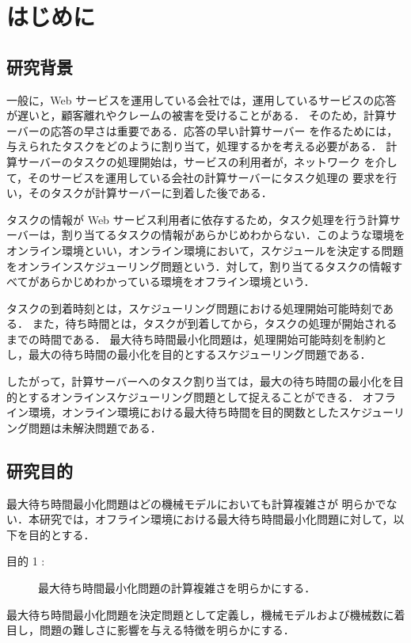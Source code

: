 \documentclass[12pt]{optlab-bachelor}
\begin{document}
\frontmatter

\chapter{はじめに}\label{c_1}
\section{研究背景}
一般に，Web サービスを運用している会社では，運用しているサービスの応答が遅いと，顧客離れやクレームの被害を受けることがある．
そのため，計算サーバーの応答の早さは重要である．応答の早い計算サーバー
を作るためには，与えられたタスクをどのように割り当て，処理するかを考える必要がある．
計算サーバーのタスクの処理開始は，サービスの利用者が，ネットワーク
を介して，そのサービスを運用している会社の計算サーバーにタスク処理の
要求を行い，そのタスクが計算サーバーに到着した後である．

タスクの情報が Web サービス利用者に依存するため，タスク処理を行う計算サーバーは，割り当てるタスクの情報があらかじめわからない．このような環境をオンライン環境といい，オンライン環境において，スケジュールを決定する問題をオンラインスケジューリング問題という．対して，割り当てるタスクの情報すべてがあらかじめわかっている環境をオフライン環境という．

タスクの到着時刻とは，スケジューリング問題における処理開始可能時刻である．
また，待ち時間とは，タスクが到着してから，タスクの処理が開始されるまでの時間である．
最大待ち時間最小化問題は，処理開始可能時刻を制約とし，最大の待ち時間の最小化を目的とするスケジューリング問題である．

したがって，計算サーバーへのタスク割り当ては，最大の待ち時間の最小化を目的とするオンラインスケジューリング問題として捉えることができる．
オフライン環境，オンライン環境における最大待ち時間を目的関数としたスケジューリング問題は未解決問題である．

\section{研究目的}
最大待ち時間最小化問題はどの機械モデルにおいても計算複雑さが
明らかでない．本研究では，オフライン環境における最大待ち時間最小化問題に対して，以下を目的とする．
\begin{description}
  \item[目的 1 :]
  最大待ち時間最小化問題の計算複雑さを明らかにする．
\end{description}

最大待ち時間最小化問題を決定問題として定義し，機械モデルおよび機械数に着目し，問題の難しさに影響を与える特徴を明らかにする．
\end{document}
